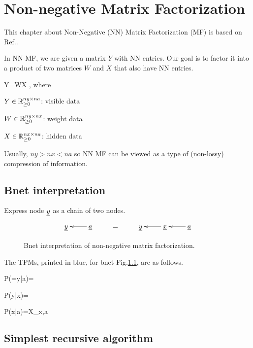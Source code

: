 \chapter{Non-negative Matrix Factorization}
\label{ch-nn-mat-fac}

This chapter about Non-Negative (NN) Matrix Factorization (MF) is based on Ref.\cite{wiki-nmf}.

In NN MF, we are given a
 matrix $Y$ with NN entries. Our goal is to factor it
 into a product of two matrices $W$ and $X$
 that also have NN entries.

\beq
Y=WX
\;,
\eeq 
where

$Y\in { \mathbb{R}}^{ny\times na}_{\geq 0}$: visible data

$W\in { \mathbb{R}}^{ny\times nx}_{\geq 0}$: weight data

$X\in { \mathbb{R}}^{nx\times na}_{\geq 0}$: hidden data


Usually, $ny > nx<na$ so 
NN MF can be viewed as a type of (non-lossy) compression of
information.

\section{Bnet 
interpretation}

 Express node ${\underline{y}}$ as a chain of 
 two nodes.

\begin{figure}[h!]
\centering
$$\xymatrix{
\rvy& \rva\ar[l]&= &\rvy &\rvx\ar[l]&\rva\ar[l]
}$$
\caption{Bnet interpretation of
non-negative matrix factorization.}
\label{fig-nmf}
\end{figure}
The TPMs, printed in blue,
for bnet Fig.\ref{fig-nmf},
are as follows.

\beq\color{blue}
P(\rvy=y|a)=
\eeq

\beq\color{blue}
P(y|x)=
\eeq

\beq\color{blue}
P(x|a)=X_{x,a}
\eeq

\section{Simplest recursive
 algorithm}

